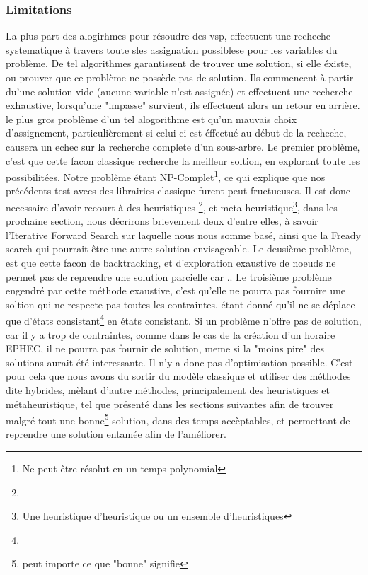 \subsubsection{Limitations}
La plus part des alogirhmes pour résoudre des vsp, effectuent une recheche systematique à travers toute sles assignation possiblese pour les variables du problème. De tel algorithmes garantissent de trouver une solution, si elle éxiste, ou prouver que ce problème ne possède pas de solution.  
Ils commencent à partir du'une solution vide (aucune variable n'est assignée) et effectuent une recherche exhaustive, lorsqu'une "impasse" survient, ils effectuent alors un retour en arrière. le plus gros problème d'un tel alogorithme est qu'un mauvais choix d'assignement, particulièrement si celui-ci est éffectué au début de la recheche, causera un echec sur la recherche complete d'un sous-arbre. 
Le premier problème, c'est que cette facon classique recherche la meilleur soltion, en explorant toute les possibilitées. Notre problème étant NP-Complet\footnote{Ne peut être résolut en un temps polynomial}, ce qui explique que nos précédents test avecs des librairies classique furent peut fructueuses.
Il est donc necessaire d'avoir recourt à des heuristiques \footnote{}, et meta-heuristique\footnote{Une heuristique d'heuristique ou un ensemble d'heuristiques}, dans les prochaine section, nous décrirons brievement deux d'entre elles, à savoir l'Iterative Forward Search sur laquelle nous nous somme basé, ainsi que la Fready search qui pourrait être une autre solution envisageable.
\newline
\indent
Le deusième problème, est que cette facon de backtracking, et d'exploration exaustive de noeuds ne permet pas de reprendre une solution parcielle car ..
\newline
\indent
Le troisième problème engendré par cette méthode exaustive, c'est qu'elle ne pourra pas fournire une soltion qui ne respecte pas toutes les contraintes, étant donné qu'il ne se déplace que d'états consistant\footnote{} en états consistant. Si un problème n'offre pas de solution, car il y a trop de contraintes, comme dans le cas de la création d'un horaire EPHEC, il ne pourra pas fournir de solution, meme si la "moins pire" des solutions aurait été interessante. Il n'y a donc pas d'optimisation possible.
\newline
\indent
C'est pour cela que nous avons du sortir du modèle classique et utiliser des méthodes dite hybrides, mèlant d'autre méthodes, principalement des heuristiques et métaheuristique, tel que présenté dans les sections suivantes afin de trouver malgré tout une bonne\footnote{peut importe ce que "bonne" signifie} solution, dans des temps accèptables, et permettant de reprendre une solution entamée afin de l'améliorer. \newline
